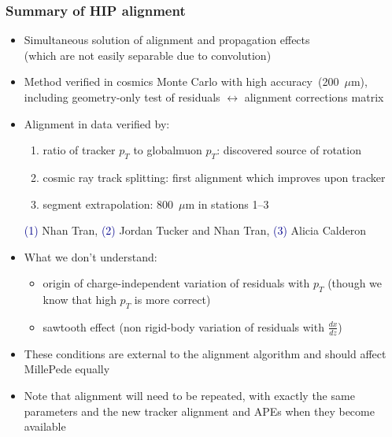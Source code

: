 \documentclass[compress]{beamer}
\begin{document}
\begin{frame}
\frametitle{Summary of HIP alignment}
\begin{itemize}
\item Simultaneous solution of alignment and propagation effects \\ {\scriptsize (which are not easily separable due to convolution)}
\item Method verified in cosmics Monte Carlo with high \mbox{accuracy (200~$\mu$m),\hspace{-1 cm}} {\scriptsize including geometry-only test of residuals $\leftrightarrow$ alignment corrections matrix}
\item Alignment in data verified by:
\begin{enumerate}\scriptsize
\item ratio of tracker $p_T$ to globalmuon $p_T$: discovered source of rotation
\item cosmic ray track splitting: first alignment which improves upon tracker
\item segment extrapolation: 800~$\mu$m in stations 1--3
\end{enumerate}

{\scriptsize \textcolor{darkblue}{(1)} Nhan Tran, \textcolor{darkblue}{(2)} Jordan Tucker and Nhan Tran, \textcolor{darkblue}{(3)} Alicia Calderon}

\item What we don't understand:
\begin{itemize}
\item origin of charge-independent variation of residuals with $p_T$ (though we know that high $p_T$ is more correct)
\item sawtooth effect (non rigid-body variation of residuals with $\frac{dx}{dz}$)
\end{itemize}

\item These conditions are external to the alignment algorithm and should affect MillePede equally

\item \scriptsize Note that alignment will need to be repeated, with exactly the same parameters and the new tracker alignment and APEs when they become available
\end{itemize}
\label{numpages}
\end{frame}

\end{document}
